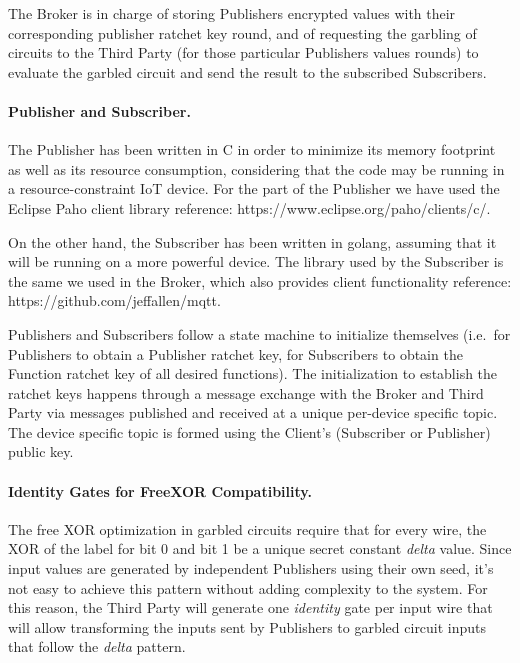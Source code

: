 The Broker is in charge of storing Publishers encrypted values with their
corresponding publisher ratchet key round, and of requesting the garbling of
circuits to the Third Party (for those particular Publishers values rounds) to
evaluate the garbled circuit and send the result to the subscribed Subscribers.

\paragraph{Publisher and Subscriber.}

The Publisher has been written in C in order to minimize its memory footprint
as well as its resource consumption, considering that the code may be running
in a resource-constraint IoT device.  For the \MQTT{} part of the Publisher we
have used the Eclipse Paho client library {reference:
https://www.eclipse.org/paho/clients/c/}.


On the other hand, the Subscriber has been written in golang, assuming that it
will be running on a more powerful device.  The \MQTT{} library used by the
Subscriber is the same we used in the Broker, which also provides client
functionality {reference: https://github.com/jeffallen/mqtt}.

Publishers and Subscribers follow a state machine to initialize themselves
(i.e.\ for Publishers to obtain a Publisher ratchet key, for Subscribers to
obtain the Function ratchet key of all desired functions).  The initialization
to establish the ratchet keys happens through a message exchange with the
Broker and Third Party via \MQTT{} messages published and received at a unique
per-device specific topic.  The device specific topic is formed using the
Client's (Subscriber or Publisher) public key.

\paragraph{Identity Gates for FreeXOR Compatibility.}

The free XOR optimization in garbled circuits require that for every wire, the
XOR of the label for bit 0 and bit 1 be a unique secret constant \emph{delta}
value.  Since input values are generated by independent Publishers using their
own seed, it's not easy to achieve this pattern without adding complexity to
the system.  For this reason, the Third Party will generate one \emph{identity}
gate per input wire that will allow transforming the inputs sent by Publishers
to garbled circuit inputs that follow the \emph{delta} pattern.

